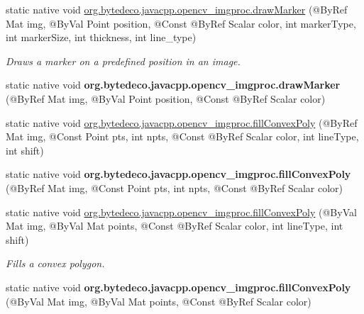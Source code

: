 \begin{DoxyCompactItemize}
\item 
static native void \hyperlink{group__imgproc__draw_gaedc7348c70c6b2c486689107ee346af3}{org.\+bytedeco.\+javacpp.\+opencv\+\_\+imgproc.\+draw\+Marker} (@By\+Ref Mat img, @By\+Val Point position, @Const @By\+Ref Scalar color, int marker\+Type, int marker\+Size, int thickness, int line\+\_\+type)
\begin{DoxyCompactList}\small\item\em Draws a marker on a predefined position in an image. \end{DoxyCompactList}\item 
\mbox{\label{group__imgproc__draw_ga5b4d20cfadb1b88098caa99988b204db}} 
static native void {\bfseries org.\+bytedeco.\+javacpp.\+opencv\+\_\+imgproc.\+draw\+Marker} (@By\+Ref Mat img, @By\+Val Point position, @Const @By\+Ref Scalar color)
\item 
static native void \hyperlink{group__imgproc__draw_ga825cdf4013e0a71e60022826a5d47037}{org.\+bytedeco.\+javacpp.\+opencv\+\_\+imgproc.\+fill\+Convex\+Poly} (@By\+Ref Mat img, @Const Point pts, int npts, @Const @By\+Ref Scalar color, int line\+Type, int shift)
\item 
\mbox{\label{group__imgproc__draw_ga81e45058cc3144cb12b3f706b801898f}} 
static native void {\bfseries org.\+bytedeco.\+javacpp.\+opencv\+\_\+imgproc.\+fill\+Convex\+Poly} (@By\+Ref Mat img, @Const Point pts, int npts, @Const @By\+Ref Scalar color)
\item 
static native void \hyperlink{group__imgproc__draw_gadde734279c0c012260b7bf8a33f44fff}{org.\+bytedeco.\+javacpp.\+opencv\+\_\+imgproc.\+fill\+Convex\+Poly} (@By\+Val Mat img, @By\+Val Mat points, @Const @By\+Ref Scalar color, int line\+Type, int shift)
\begin{DoxyCompactList}\small\item\em Fills a convex polygon. \end{DoxyCompactList}\item 
\mbox{\label{group__imgproc__draw_gac89b28becb0488e662daef2c0300e7c5}} 
static native void {\bfseries org.\+bytedeco.\+javacpp.\+opencv\+\_\+imgproc.\+fill\+Convex\+Poly} (@By\+Val Mat img, @By\+Val Mat points, @Const @By\+Ref Scalar color)
\item 
\mbox{\label{group__imgproc__draw_ga9076c390b47e180ec4f854127545d84e}} 

\end{DoxyCompactItemize}
